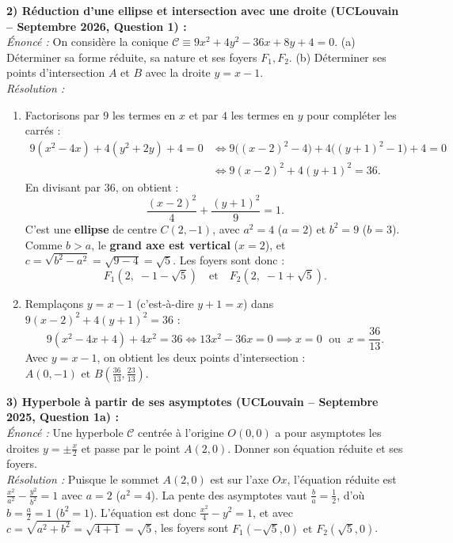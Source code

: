 \begin{exemple}
\medskip
\textbf{2) Réduction d'une ellipse et intersection avec une droite (UCLouvain -- Septembre 2026, Question 1) :}\\
\emph{Énoncé :} On considère la conique $\mathcal{C} \equiv 9x^2 + 4y^2 - 36x + 8y + 4 = 0$. (a) Déterminer sa forme réduite, sa nature et ses foyers $F_1, F_2$. (b) Déterminer ses points d'intersection $A$ et $B$ avec la droite $y = x - 1$.\\
\emph{Résolution :}
\begin{enumerate}[label=(\alph*)]
    \item Factorisons par $9$ les termes en $x$ et par $4$ les termes en $y$ pour compléter les carrés :
    \begin{align*}
        9(x^2 - 4x) + 4(y^2 + 2y) + 4 = 0 &\iff 9\bigl((x-2)^2 - 4\bigr) + 4\bigl((y+1)^2 - 1\bigr) + 4 = 0 \\
        &\iff 9(x-2)^2 + 4(y+1)^2 = 36.
    \end{align*}
    En divisant par $36$, on obtient :
    \[
        \boxed{\frac{(x-2)^2}{4} + \frac{(y+1)^2}{9} = 1}.
    \]
    C'est une \textbf{ellipse} de centre $C(2, -1)$, avec $a^2 = 4$ ($a=2$) et $b^2 = 9$ ($b=3$). Comme $b > a$, le \textbf{grand axe est vertical} ($x = 2$), et $c = \sqrt{b^2 - a^2} = \sqrt{9 - 4} = \sqrt{5}$. Les foyers sont donc :
    \[
        \boxed{F_1(2,\; -1 - \sqrt{5}) \quad \text{et} \quad F_2(2,\; -1 + \sqrt{5})}.
    \]
    \item Remplaçons $y = x - 1$ (c'est-à-dire $y + 1 = x$) dans $9(x-2)^2 + 4(y+1)^2 = 36$ :
    \[
        9(x^2 - 4x + 4) + 4x^2 = 36 \iff 13x^2 - 36x = 0 \implies x = 0 \;\text{ ou }\; x = \frac{36}{13}.
    \]
    Avec $y = x - 1$, on obtient les deux points d'intersection : $\boxed{A(0, -1) \text{ et } B\left(\frac{36}{13}, \frac{23}{13}\right)}$.
\end{enumerate}

\medskip
\textbf{3) Hyperbole à partir de ses asymptotes (UCLouvain -- Septembre 2025, Question 1a) :}\\
\emph{Énoncé :} Une hyperbole $\mathcal{C}$ centrée à l'origine $O(0,0)$ a pour asymptotes les droites $y = \pm \frac{x}{2}$ et passe par le point $A(2, 0)$. Donner son équation réduite et ses foyers.\\
\emph{Résolution :} Puisque le sommet $A(2,0)$ est sur l'axe $Ox$, l'équation réduite est $\frac{x^2}{a^2} - \frac{y^2}{b^2} = 1$ avec $a = 2$ ($a^2 = 4$). La pente des asymptotes vaut $\frac{b}{a} = \frac{1}{2}$, d'où $b = \frac{a}{2} = 1$ ($b^2 = 1$). L'équation est donc $\boxed{\frac{x^2}{4} - y^2 = 1}$, et avec $c = \sqrt{a^2+b^2} = \sqrt{4+1} = \sqrt{5}$, les foyers sont $\boxed{F_1(-\sqrt{5}, 0) \text{ et } F_2(\sqrt{5}, 0)}$.


\end{exemple}
